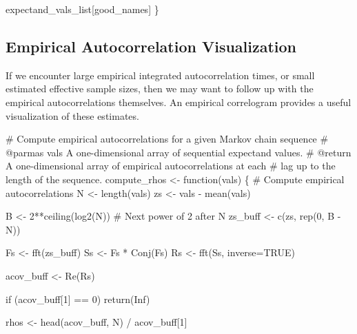 \documentclass[
  letterpaper,
  DIV=11,
  numbers=noendperiod]{scrartcl}
\newenvironment{Shaded}{\begin{snugshade}}{\end{snugshade}}
\newcommand{\CommentTok}[1]{\textcolor[rgb]{0.37,0.37,0.37}{#1}}
\newcommand{\ControlFlowTok}[1]{\textcolor[rgb]{0.00,0.23,0.31}{#1}}
\newcommand{\DecValTok}[1]{\textcolor[rgb]{0.68,0.00,0.00}{#1}}
\newcommand{\NormalTok}[1]{\textcolor[rgb]{0.00,0.23,0.31}{#1}}
\newcommand{\OperatorTok}[1]{\textcolor[rgb]{0.37,0.37,0.37}{#1}}
\begin{document}
\begin{Shaded}
\begin{Highlighting}[]
\NormalTok{  expectand\_vals\_list[good\_names]}
\NormalTok{\}}
\end{Highlighting}
\end{Shaded}

\subsection{Empirical Autocorrelation
Visualization}\label{empirical-autocorrelation-visualization}

If we encounter large empirical integrated autocorrelation times, or
small estimated effective sample sizes, then we may want to follow up
with the empirical autocorrelations themselves. An empirical correlogram
provides a useful visualization of these estimates.

\begin{Shaded}
\begin{Highlighting}[]
\CommentTok{\# Compute empirical autocorrelations for a given Markov chain sequence}
\CommentTok{\# @parmas vals A one{-}dimensional array of sequential expectand values.}
\CommentTok{\# @return A one{-}dimensional array of empirical autocorrelations at each}
\CommentTok{\#         lag up to the length of the sequence.}
\NormalTok{compute\_rhos }\OperatorTok{\textless{}{-}}\NormalTok{ function(vals) \{}
  \CommentTok{\# Compute empirical autocorrelations}
\NormalTok{  N }\OperatorTok{\textless{}{-}}\NormalTok{ length(vals)}
\NormalTok{  zs }\OperatorTok{\textless{}{-}}\NormalTok{ vals }\OperatorTok{{-}}\NormalTok{ mean(vals)}

\NormalTok{  B }\OperatorTok{\textless{}{-}} \DecValTok{2}\OperatorTok{**}\NormalTok{ceiling(log2(N)) }\CommentTok{\# Next power of 2 after N}
\NormalTok{  zs\_buff }\OperatorTok{\textless{}{-}}\NormalTok{ c(zs, rep(}\DecValTok{0}\NormalTok{, B }\OperatorTok{{-}}\NormalTok{ N))}

\NormalTok{  Fs }\OperatorTok{\textless{}{-}}\NormalTok{ fft(zs\_buff)}
\NormalTok{  Ss }\OperatorTok{\textless{}{-}}\NormalTok{ Fs }\OperatorTok{*}\NormalTok{ Conj(Fs)}
\NormalTok{  Rs }\OperatorTok{\textless{}{-}}\NormalTok{ fft(Ss, inverse}\OperatorTok{=}\NormalTok{TRUE)}

\NormalTok{  acov\_buff }\OperatorTok{\textless{}{-}}\NormalTok{ Re(Rs)}

  \ControlFlowTok{if}\NormalTok{ (acov\_buff[}\DecValTok{1}\NormalTok{] }\OperatorTok{==} \DecValTok{0}\NormalTok{)}
    \ControlFlowTok{return}\NormalTok{(Inf)}

\NormalTok{  rhos }\OperatorTok{\textless{}{-}}\NormalTok{ head(acov\_buff, N) }\OperatorTok{/}\NormalTok{ acov\_buff[}\DecValTok{1}\NormalTok{]}


\end{Highlighting}
\end{Shaded}
\end{document}
